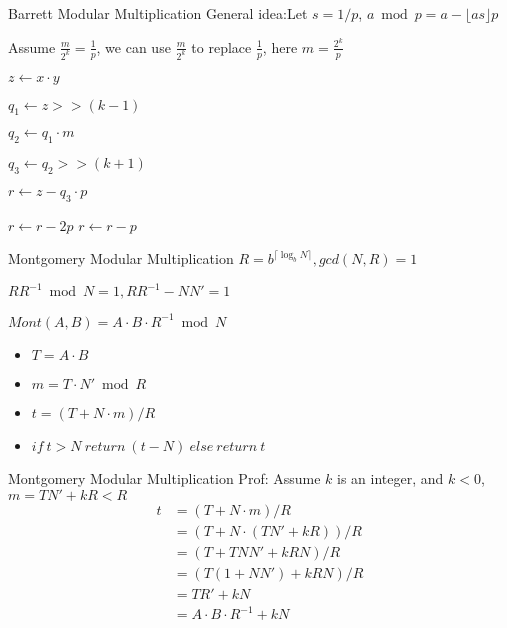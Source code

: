 \documentclass{beamer}
\begin{document}
\begin{frame}{Barrett Modular Multiplication}
General idea:Let $s = 1/p$, $a \bmod p = a - \lfloor as \rfloor p$

Assume $\frac{m}{2^k} = \frac{1}{p}$, we can use $\frac{m}{2^k}$ to replace $\frac{1}{p}$, here $m = \frac{2^k}{p}$
	\begin{algorithmic}
	
		\STATE $z \leftarrow x \cdot y$
	
		\STATE $q_1 \leftarrow z >> (k-1)$
	
		\STATE $q_2 \leftarrow q_1 \cdot m$
	
		\STATE $q_3 \leftarrow q_2 >> (k+1)$
	
		\STATE $r \leftarrow z - q_3 \cdot p$
	
			\STATE $r \leftarrow r - 2p$ 
			\STATE$r \leftarrow r - p$
		\ENDIF
\end{algorithmic}
\end{frame}

\begin{frame}{Montgomery Modular Multiplication}
$R = b^{\lceil \log_b N \rceil},  gcd(N,R)=1$

$RR^{-1} \bmod N = 1, RR^{-1} - NN' = 1$

\hspace*{\fill}

	$Mont(A,B) = A \cdot B \cdot R^{-1} \bmod N$

	\begin{itemize}
	\item $T = A \cdot B$
	\item $m =  T \cdot N' \bmod R$ 
    \item $t = (T + N\cdot m)/R$
    \item $if \ t>N \ return \ (t-N)\  else \  return \ t$
\end{itemize}
\end{frame}

\begin{frame}{Montgomery Modular Multiplication}
Prof: Assume $k$ is an integer, and $k < 0$, $m = TN'+kR < R$ 
	\begin{equation}\nonumber
		\begin{aligned}
		t &= (T + N\cdot m)/R \\
		&= (T + N\cdot(TN'+kR)) / R \\
		&= (T + TNN' + kRN)/R \\
		&= (T(1+NN')+kRN)/R\\
		&= TR' + kN \\
		&= A \cdot B \cdot R^{-1} + kN
\end{aligned}
	\end{equation}
\end{frame}
\end{document}
